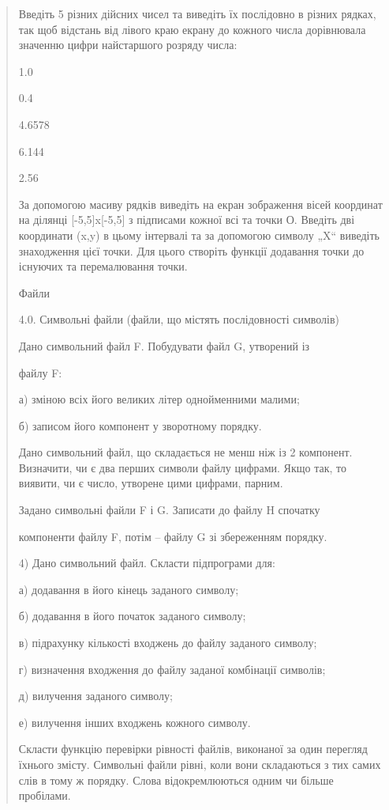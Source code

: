 \documentclass[]{article}
\begin{document}
\begin{quote}
Введіть 5 різних дійсних чисел та виведіть їх послідовно в різних
рядках, так щоб відстань від лівого краю екрану до кожного числа
дорівнювала значенню цифри найстаршого розряду числа:

1.0

0.4

4.6578

6.144

2.56

За допомогою масиву рядків виведіть на екран зображення вісей координат
на ділянці {[}-5,5{]}x{[}-5,5{]} з підписами кожної всі та точки О.
Введіть дві координати (x,y) в цьому інтервалі та за допомогою символу
„X`` виведіть знаходження цієї точки. Для цього створіть функції
додавання точки до існуючих та перемалювання точки.

\protect\hypertarget{_Hlk48904419}{}{}Файли

4.0. Символьні файли (файли, що містять послідовності символів)

Дано символьний файл F. Побудувати файл G, утворений із

файлу F:

а) зміною всіх його великих літер однойменними малими;

б) записом його компонент у зворотному порядку.

Дано символьний файл, що складається не менш ніж із 2 компонент.
Визначити, чи є два перших символи файлу цифрами. Якщо так, то виявити,
чи є число, утворене цими цифрами, парним.

Задано символьні файли F і G. Записати до файлу H спочатку

компоненти файлу F, потім -- файлу G зі збереженням порядку.

4) Дано символьний файл. Скласти підпрограми для:

а) додавання в його кінець заданого символу;

б) додавання в його початок заданого символу;

в) підрахунку кількості входжень до файлу заданого символу;

г) визначення входження до файлу заданої комбінації символів;

д) вилучення заданого символу;

е) вилучення інших входжень кожного символу.

Скласти функцію перевірки рівності файлів, виконаної за один перегляд
їхнього змісту. Символьні файли рівні, коли вони складаються з тих самих
слів в тому ж порядку. Слова відокремлюються одним чи більше пробілами.


\end{quote}
\end{document}
